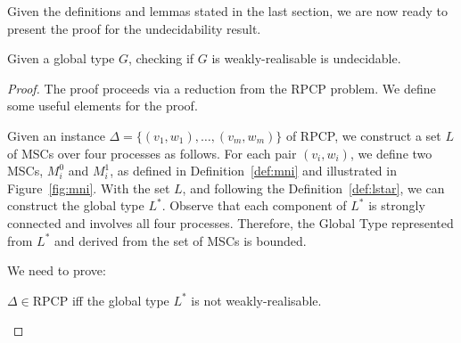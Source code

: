 Given the definitions and lemmas stated in the last section, we are now ready
to present the proof for the undecidability result.

\bigskip

\begin{theorem}\label{thm:main}
	Given a global type $G$, checking if $G$ is weakly-realisable is undecidable.
\end{theorem}

\begin{proof}
	The proof proceeds via a reduction from the RPCP problem. We define some useful
	elements for the proof.

	Given an instance $\Delta = \{(v_1, w_1), \ldots, (v_m, w_m)\}$ of RPCP, we
	construct a set $L$ of MSCs over four processes as follows. For each pair
	$(v_i, w_i)$, we define two MSCs, $M^0_i$ and $M^1_i$, as defined in 
	Definition~\ref{def:mni} and illustrated in	Figure~\ref{fig:mni}.
	With the set $L$, and following the Definition~\ref{def:lstar},
	we can construct the global type $L^*$.
	Observe that each component of $L^*$ is strongly connected and
	involves all four processes. Therefore, the Global Type represented from
	$L^*$ and derived from the set of MSCs is bounded.

	We need to prove:
	\begin{center}
		$\Delta \in \text{RPCP}$ iff the global type $L^*$ is not weakly-realisable.
	\end{center}


\end{proof}
